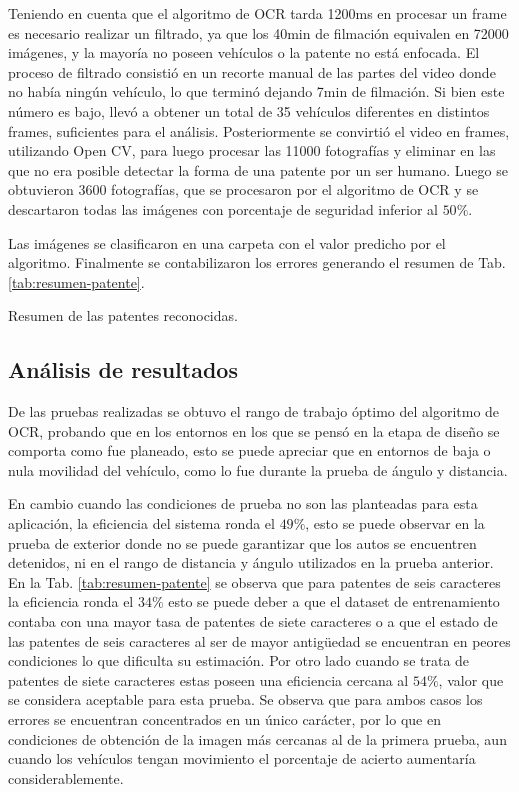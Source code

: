 Teniendo en cuenta que el algoritmo de OCR tarda 1200ms en procesar un frame es necesario realizar un filtrado, ya que los 40min de filmación equivalen en 72000 imágenes, y la mayoría no poseen vehículos o la patente no está enfocada.
El proceso de filtrado consistió en un recorte manual de las partes del video donde no había ningún vehículo, lo que terminó dejando 7min de filmación. Si bien este número es bajo, llevó a obtener un total de 35 vehículos diferentes en distintos frames, suficientes para el análisis. Posteriormente se convirtió el video en frames, utilizando Open CV, para luego procesar las 11000 fotografías y eliminar en las que no era posible detectar la forma de una patente por un ser humano. Luego se obtuvieron 3600 fotografías, que se procesaron por el algoritmo de OCR y se descartaron todas las imágenes con porcentaje de seguridad inferior al $50\%$.


Las imágenes se clasificaron en una carpeta con el valor predicho por el algoritmo.
Finalmente se contabilizaron los errores generando el resumen de Tab. \ref{tab:resumen-patente}.

\begin{table}
    \centering
    
    \caption{Resumen de las patentes reconocidas.}
    \label{tab:resumen-patente}
\end{table}


\subsection{Análisis de resultados}

De las pruebas realizadas se obtuvo el rango de trabajo óptimo del algoritmo de OCR, probando que en los entornos en los que se pensó en la etapa de diseño se comporta como fue planeado, esto se puede apreciar que en entornos de baja o nula movilidad del vehículo, como lo fue durante la prueba de ángulo y distancia.

En cambio cuando las condiciones de prueba no son las planteadas para esta aplicación, la eficiencia del sistema ronda el $49\%$, esto se puede observar en la prueba de exterior donde no se puede garantizar que los autos se encuentren detenidos, ni en el rango de distancia y ángulo utilizados en la prueba anterior. 
En la Tab. \ref{tab:resumen-patente} se observa que para patentes de seis caracteres la eficiencia ronda el $34\%$ esto se puede deber a que el dataset de entrenamiento contaba con una mayor tasa de patentes de siete caracteres o a que el estado de las patentes de seis caracteres al ser de mayor antigüedad se encuentran en peores condiciones lo que dificulta su estimación.
Por otro lado cuando se trata de patentes de siete caracteres estas poseen una eficiencia cercana al $54\%$, valor que se considera aceptable para esta prueba.
Se observa que para ambos casos los errores se encuentran concentrados en un único carácter, por lo que en condiciones de obtención de la imagen más cercanas al de la primera prueba, aun cuando los vehículos tengan movimiento el porcentaje de acierto aumentaría considerablemente.

